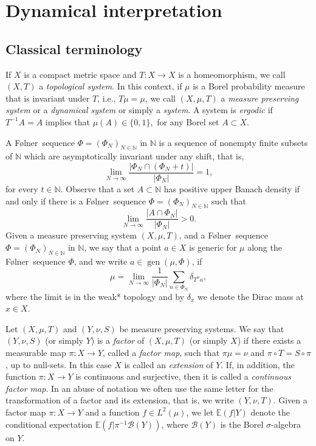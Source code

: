 \documentclass[letter, 11pt]{article}
\newcommand{\Folner}{F\o{}lner}
\theoremstyle{definition}
\theoremstyle{plain}
\newcommand{\N}{\mathbb{N}}
\DeclareMathOperator\gen{gen}
\newcommand{\1}{\mathbbm{1}}
\begin{document}
\section{Dynamical interpretation} \label{reduction to dynamics and outline of proofs}

\subsection{Classical terminology}\label{Terminology}

If $X$ is a compact metric space and $T:X \to X$ is a homeomorphism, we call
$(X,T)$ a \emph{topological system}. In this context, if $\mu$ is a Borel 
probability measure that is invariant under $T$, i.e., $T\mu=\mu$, 
we call $(X,\mu,T)$ a \emph{measure preserving system} or a 
\emph{dynamical system} or simply a \emph{system}. A system is 
\emph{ergodic} if $T^{-1}A=A$ implies that  $\mu(A)\in \{0,1\},$ for any Borel set $A\subset X$.

A \Folner\ sequence $\Phi=(\Phi_N)_{N\in \N}$ in $\N$ is a sequence of nonempty finite subsets of $\N$ which are asymptotically invariant under any shift, that is, 
$$\lim_{N\to \infty} \frac{|\Phi_N \cap (\Phi_N+t)|}{|\Phi_N|}=1,$$
for every $t\in \N$. Observe that a set $A\subset \N$ has positive upper Banach density if and only if there is a \Folner\ sequence $\Phi=(\Phi_N)_{N\in \N}$ such that 
$$ \lim_{N\to \infty} \frac{|A\cap \Phi_N|}{|\Phi_N|}>0.$$
Given a measure preserving system $(X,\mu,T)$, and a \Folner\ sequence 
$\Phi=(\Phi_N)_{N\in \N}$ in $\N$, we say that a point $a\in X$ is generic 
for $\mu$ along the \Folner\ sequence $\Phi$, and we write $a\in \gen(\mu,\Phi)$, if 
$$\mu=\lim_{N\to \infty} \frac{1}{|\Phi_N|} \sum_{n\in \Phi_N} \delta_{T^na}, $$
where the limit is in the weak* topology and by $\delta_x$ we denote the Dirac mass at $x\in X$. 

Let $(X, \mu,T)$ and $(Y,\nu,S)$ be measure preserving systems. We say that $(Y, \nu,S)$ (or simply $Y$) is a \emph{factor} of $(X, \mu,T)$ (or simply $X$) if there exists a measurable map $\pi \colon X \to Y$, called a \emph{factor map}, such that $\pi\mu = \nu$ and $\pi \circ T = S \circ \pi$, up to null-sets. In this case $X$ is called an \emph{extension} of $Y$. 
If, in addition, the function $\pi \colon X \to Y$ is continuous and 
surjective, then it is called a \emph{continuous factor map}. In an abuse of notation we often use the same letter for the transformation of a factor and its extension, that is, we write $(Y,\nu,T)$. Given a factor map $\pi: X\to Y$ and a function $f\in L^2(\mu)$, 
we let $\mathbb{E}(f | Y)$ denote the conditional expectation 
$\mathbb{E}(f | \pi^{-1}\mathcal{B}(Y))$, where $\mathcal{B}(Y)$ is the Borel 
$\sigma$-algebra on $Y$.
\end{document}
